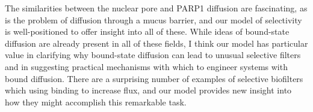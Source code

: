 The similarities between the nuclear pore and PARP1 diffusion are fascinating, as is the problem of diffusion through a mucus barrier, and our model of selectivity is well-positioned to offer insight into all of these.  While ideas of bound-state diffusion are already present in all of these fields, I think our model has particular value in clarifying why bound-state diffusion can lead to unusual selective filters and in suggesting practical mechanisms with which to engineer systems with bound diffusion.  There are a surprising number of examples of selective biofilters which using binding to increase flux, and our model provides new insight into how they might accomplish this remarkable task.


